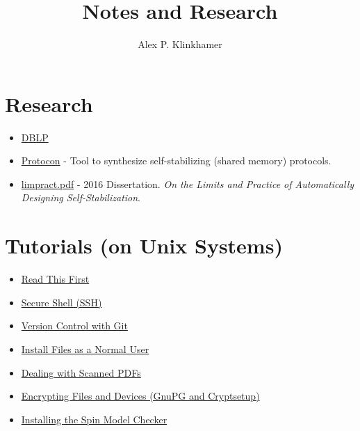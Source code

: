 

\title[grencez: code forwards]{Notes and Research}
\author{Alex P. Klinkhamer}
\date{}



\section{Research}
\begin{itemize}
\item \href{http://www.informatik.uni-trier.de/~ley/pers/hd/k/Klinkhamer:Alex}{DBLP}
\item \href{http://grencez.github.io/protocon}{Protocon} - Tool to synthesize self-stabilizing (shared memory) protocols.
\item \href{selfstabiliz/limpract.pdf}{limpract.pdf} - 2016 Dissertation. \textit{On the Limits and Practice of Automatically Designing Self-Stabilization}.
\end{itemize}

\section{Tutorials (on Unix Systems)}
\begin{itemize}
\item \href{tut/prelim.html}{Read This First}
\item \href{tut/ssh.html}{Secure Shell (SSH)}
\item \href{tut/git.html}{Version Control with Git}
\item \href{tut/install.html}{Install Files as a Normal User}
\item \href{tut/pdfscan.html}{Dealing with Scanned PDFs}
\item \href{tut/encrypt.html}{Encrypting Files and Devices (GnuPG and Cryptsetup)}
\item \href{tut/spin.html}{Installing the Spin Model Checker}
\end{itemize}



